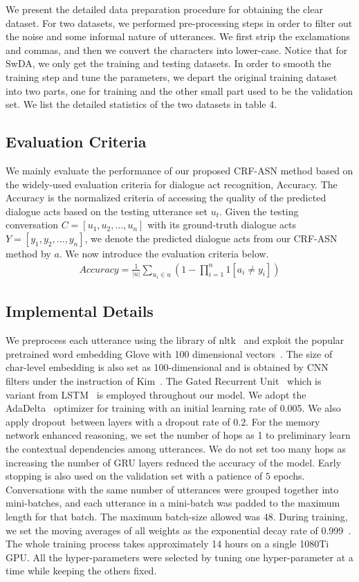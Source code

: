\documentclass[sigconf]{acmart}
\begin{document}
We present the detailed data preparation procedure for obtaining the clear dataset. For two datasets, we performed pre-processing steps in order to filter out the noise and some informal nature of utterances. We first strip the exclamations and commas, and then we convert the characters into lower-case. Notice that for SwDA, we only get the training and testing datasets. In order to smooth the training step and tune the parameters, we depart the original training dataset into two parts, one for training and the other small part used to be the validation set. We list the detailed statistics of the two datasets in table 4. 

\subsection{Evaluation Criteria}
We mainly evaluate the performance of our proposed CRF-ASN method based on the  widely-used evaluation criteria for dialogue act recognition, Accuracy. The Accuracy is the normalized criteria of accessing the quality of the predicted dialogue acts based on the testing utterance set $u_t$. Given the testing conversation $C=[u_1,u_2,...,u_n]$ with its ground-truth dialogue acts $Y=[y_1,y_2,...,y_n]$, we denote the predicted dialogue acts from our CRF-ASN method by $a$. We now introduce the evaluation criteria below.
\begin{align*}
	Accuracy=\frac{1}{|u|}\sum_{u_i \in u}(1-\prod_{i=1}^{n}1[a_i\neq y_i]) \tag{15}
\end{align*}

\subsection{Implemental Details}
We preprocess each utterance using the library of nltk~\cite{loper2002nltk} and exploit the popular pretrained word embedding Glove with 100 dimensional vectors~\cite{pennington2014glove}. The size of char-level embedding is also set as 100-dimensional and is obtained by CNN filters under the instruction of Kim~\cite{kim2016character}. The Gated Recurrent Unit~\cite{cho2014properties} which is variant from LSTM~\cite{hochreiter1997long} is employed throughout our model. We adopt the AdaDelta~\cite{zeileradadelta} optimizer for training with an initial learning rate of 0.005. We also apply  dropout~\cite{srivastava2014dropout}between layers with a dropout rate of 0.2. For the memory network enhanced reasoning, we set the number of hops as 1 to preliminary learn the contextual dependencies among utterances. We do not set too many hops as increasing the number of GRU layers reduced the accuracy of the model. Early stopping is also used on the validation set with a patience of $5$ epochs. Conversations with the same number of utterances were grouped together into mini-batches, and each utterance in a mini-batch was padded to the maximum length for that batch. The maximum batch-size allowed was $48$. During training, we set the moving averages of all weights as the exponential decay rate of 0.999~\cite{lucas1990exponentially}. The whole training process takes approximately 14 hours on a single 1080Ti GPU. All the hyper-parameters were selected by tuning one hyper-parameter at a time while keeping the others fixed. 
\end{document}
